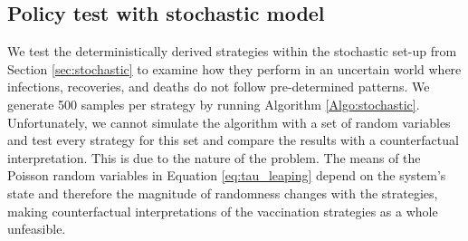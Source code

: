 \clearpage
\subsection{Policy test with stochastic model}
We test the deterministically derived strategies within the stochastic set-up from Section \ref{sec:stochastic} to examine how they perform in an uncertain world where infections, recoveries, and deaths do not follow pre-determined patterns. We generate 500 samples per strategy by running Algorithm \ref{Algo:stochastic}. Unfortunately, we cannot simulate the algorithm with a set of random variables and test every strategy for this set and compare the results with a counterfactual interpretation. This is due to the nature of the problem. The means of the Poisson random variables in Equation \eqref{eq:tau_leaping} depend on the system's state and therefore the magnitude of randomness changes with the strategies, making counterfactual interpretations of the vaccination strategies as a whole unfeasible.  \\ 

